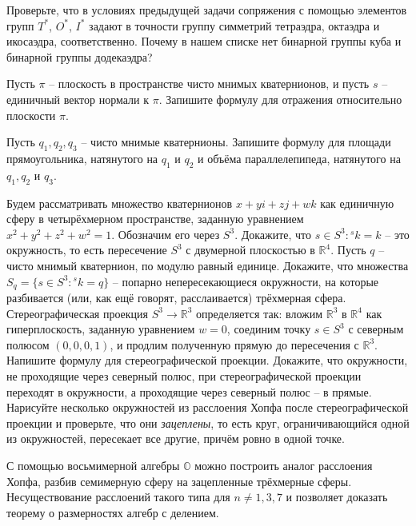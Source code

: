 \documentclass[a4paper, 12pt]{article}
\begin{document}
	Проверьте, что в условиях предыдущей задачи сопряжения с помощью элементов групп  $T^*$,  $O^*$,  $I^*$ задают в точности группу симметрий тетраэдра, октаэдра и икосаэдра, соответственно.  Почему в нашем списке нет бинарной группы куба и бинарной группы додекаэдра?

	Пусть $\pi$ -- плоскость в пространстве чисто мнимых кватернионов, и пусть $s$ -- единичный вектор нормали к $\pi$. Запишите формулу для отражения относительно плоскости $\pi$.

	Пусть $q_1,q_2,q_3$ -- чисто мнимые кватернионы. Запишите формулу для площади прямоугольника, натянутого на $q_1$ и $q_2$ и объёма параллелепипеда, натянутого на $q_1,q_2$ и $q_3$.

	Будем рассматривать множество кватернионов $x+yi+zj+wk$ как единичную сферу в четырёхмерном пространстве, заданную уравнением $x^2+y^2+z^2+w^2=1$. Обозначим его через $S^3$.  Докажите, что ${s \in S^3 : {}^sk = k}$ -- это окружность, то есть пересечение $S^3$ с двумерной плоскостью в $\mathbb{R}^4$.  Пусть $q$ -- чисто мнимый кватернион, по модулю равный единице. Докажите, что множества $S_q = \{s \in S^3 : {}^sk=q \}$ -- попарно непересекающиеся окружности, на которые разбивается (или, как ещё говорят, расслаивается) трёхмерная сфера. Стереографическая проекция $S^3 \to \mathbb{R}^3$ определяется так: вложим $\mathbb{R}^3$ в $\mathbb{R}^4$ как гиперплоскость, заданную уравнением $w=0$, соединим точку $s \in S^3$ с северным полюсом $(0,0,0,1)$, и продлим полученную прямую до пересечения с $\mathbb{R}^3$.  Напишите формулу для стереографической проекции.  Докажите, что окружности, не проходящие через северный полюс, при стереографической проекции переходят в окружности, а проходящие через северный полюс -- в прямые. Нарисуйте несколько окружностей из расслоения Хопфа после стереографической проекции и проверьте, что они \emph{зацеплены}, то есть круг, ограничивающийся одной из окружностей, пересекает все другие, причём ровно в одной точке.

{\small С помощью восьмимерной алгебры $\mathbb{O}$ можно построить аналог расслоения Хопфа, разбив семимерную сферу на зацепленные трёхмерные сферы. Несуществование расслоений такого типа для $n \neq 1, 3, 7$ и позволяет доказать теорему о размерностях алгебр с делением.}


\end{document}
